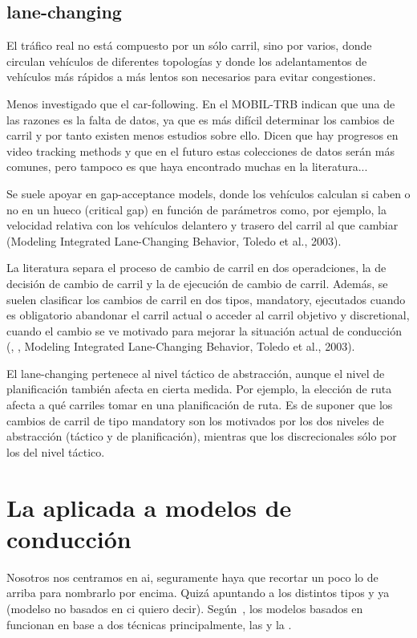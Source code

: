 \subsection{lane-changing}

El tráfico real no está compuesto por un sólo carril, sino por varios, donde circulan vehículos de diferentes topologías y donde los adelantamentos de vehículos más rápidos a más lentos son necesarios para evitar congestiones.

Menos investigado que el car-following. En el MOBIL-TRB indican que una de las razones es la falta de datos, ya que es más difícil determinar los cambios de carril y por tanto existen menos estudios sobre ello. Dicen que hay progresos en video tracking methods y que en el futuro estas colecciones de datos serán más comunes, pero tampoco es que haya encontrado muchas en la literatura...

Se suele apoyar en gap-acceptance models, donde los vehículos calculan si caben o no en un hueco (critical gap) en función de parámetros como, por ejemplo, la velocidad relativa con los vehículos delantero y trasero del carril al que cambiar (Modeling Integrated Lane-Changing Behavior, Toledo et al., 2003).

La literatura separa el proceso de cambio de carril en dos operadciones, la de decisión de cambio de carril y la de ejecución de cambio de carril. Además, se suelen clasificar los cambios de carril en dos tipos, mandatory, ejecutados cuando es obligatorio abandonar el carril actual o acceder al carril objetivo y discretional, cuando el cambio se ve motivado para mejorar la situación actual de conducción (\cite{Gipps1986}, \cite{Yang1996}, 
Modeling Integrated Lane-Changing Behavior, Toledo et al., 2003).

El lane-changing pertenece al nivel táctico de abstracción, aunque el nivel de planificación también afecta en cierta medida. Por ejemplo, la elección de ruta afecta a qué carriles tomar en una planificación de ruta. Es de suponer que los cambios de carril de tipo mandatory son los motivados por los dos niveles de abstracción (táctico y de planificación), mientras que los discrecionales sólo por los del nivel táctico.

\section{La  aplicada a modelos de conducción}

Nosotros nos centramos en \acrshort{ai}, seguramente haya que recortar un poco lo de arriba para nombrarlo por encima. Quizá apuntando a los distintos tipos y ya (modelso no basados en \gls{ci} quiero decir). Según~\cite{Aghabayk2015}, los modelos basados en  funcionan en base a dos técnicas principalmente, las  y la .

